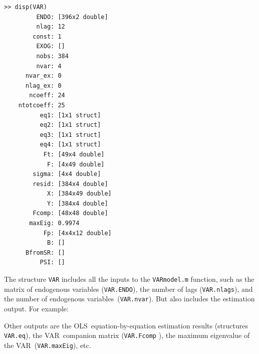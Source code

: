 \documentclass[10pt]{article}
\begin{document}
\setlength{\parindent}{.2cm}
\begin{verbatim}
>> disp(VAR)
         ENDO: [396x2 double]
         nlag: 12
        const: 1
         EXOG: []
         nobs: 384
         nvar: 4
      nvar_ex: 0
      nlag_ex: 0
       ncoeff: 24
    ntotcoeff: 25
          eq1: [1x1 struct]
          eq2: [1x1 struct]
          eq3: [1x1 struct]
          eq4: [1x1 struct]
           Ft: [49x4 double]
            F: [4x49 double]
        sigma: [4x4 double]
        resid: [384x4 double]
            X: [384x49 double]
            Y: [384x4 double]
        Fcomp: [48x48 double]
       maxEig: 0.9974
           Fp: [4x4x12 double]
            B: []
      BfromSR: []
          PSI: []
\end{verbatim}

\setlength{\parindent}{.0cm}

The structure \texttt{VAR} includes all the inputs to the \texttt{VARmodel.m}
function, such as the matrix of endogenous variables (\texttt{VAR.ENDO}),
the number of lags (\texttt{VAR.nlags}), and the number of endogenous
variables\ (\texttt{VAR.nvar}). But also includes the estimation output. For
example:


Other outputs are the OLS\ equation-by-equation estimation results
(structures \texttt{VAR.eq}), the VAR\ companion matrix (\texttt{VAR.Fcomp}%
), the maximum eigenvalue of the VAR\ (\texttt{VAR.maxEig}), etc.\ 
\end{document}
